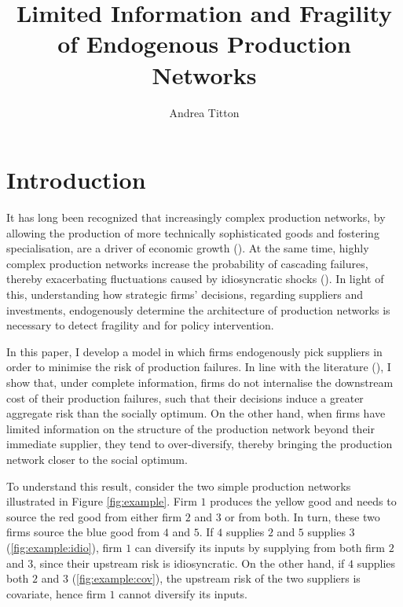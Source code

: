 \documentclass[american, abstract=on]{scrartcl}
\author{Andrea Titton}
\title{Limited Information and Fragility of Endogenous Production Networks}
\begin{document}
\maketitle

\section{Introduction}

It has long been recognized that increasingly complex production networks, by allowing the production of more technically sophisticated goods and fostering specialisation, are a driver of economic growth (\cite{kremer_population_1993,acemoglu_endogenous_2020}). At the same time, highly complex production networks increase the probability of cascading failures, thereby exacerbating fluctuations caused by idiosyncratic shocks (\cite{acemoglu_network_2012,baqaee_macroeconomic_2019,guerrieri_macroeconomic_2020}). In light of this, understanding how strategic firms' decisions, regarding suppliers and investments, endogenously determine the architecture of production networks is necessary to detect fragility and for policy intervention. 

In this paper, I develop a model in which firms endogenously pick suppliers in order to minimise the risk of production failures. In line with the literature (\cite{elliott_supply_2022}), I show that, under complete information, firms do not internalise the downstream cost of their production failures, such that their decisions induce a greater aggregate risk than the socially optimum. On the other hand, when firms have limited information on the structure of the production network beyond their immediate supplier, they tend to over-diversify, thereby bringing the production network closer to the social optimum. 

To understand this result, consider the two simple production networks illustrated in Figure \ref{fig:example}. Firm $1$ produces the yellow good and needs to source the red good from either firm $2$ and $3$ or from both. In turn, these two firms source the blue good from $4$ and $5$. If $4$ supplies $2$ and $5$ supplies $3$ (\ref{fig:example:idio}), firm $1$ can diversify its inputs by supplying from both firm $2$ and $3$, since their upstream risk is idiosyncratic. On the other hand, if $4$ supplies both $2$ and $3$ (\ref{fig:example:cov}), the upstream risk of the two suppliers is covariate, hence firm $1$ cannot diversify its inputs.
\end{document}
